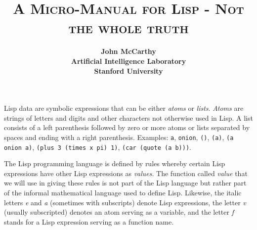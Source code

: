 \documentclass[8pt,letter,twocolumn]{article}
\title{\small \textbf{\textsc{{A Micro-Manual for Lisp - Not the whole truth}}}}
\author{\footnotesize \bfseries John McCarthy\\
            \footnotesize \bfseries Artificial Intelligence Laboratory\\
            \footnotesize \bfseries Stanford University}
\date{}
\begin{document}
\setcounter{page}{215}
\maketitle


Lisp data are symbolic expressions that can be either \textit{atoms} or
\textit{lists}. \textit{Atoms} are strings of letters and digits and other
characters not otherwise used in Lisp. A list consists of a left parenthesis
followed by zero or more atoms or lists separated by spaces and ending with a
right parenthesis. Examples: \texttt{a}, \texttt{onion}, \texttt{()},
\texttt{(a)}, \texttt{(a onion a)}, \texttt{(plus 3 (times x pi) 1)},
\texttt{(car (quote (a b)))}.

The Lisp programming language is defined by rules whereby certain Lisp
expressions have other Lisp expressions as \textit{values}. The function called
\textit{value} that we will use in giving these rules is not part of the Lisp
language but rather part of the informal mathematical language used to define
Lisp. Likewise, the italic letters \textit{e} and \textit{a} (sometimes with
subscripts) denote Lisp expressions, the letter \textit{v} (usually subscripted)
denotes an atom serving as a variable, and the letter \textit{f} stands for a
Lisp expression serving as a function name.
\end{document}
